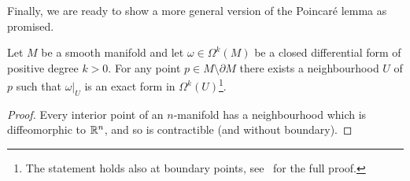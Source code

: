 Finally, we are ready to show a more general version of the Poincar\'e lemma as promised.

\begin{corollary}\label{cor:plemma}
	Let $M$ be a smooth manifold and let $\omega\in\Omega^k(M)$ be a closed differential form of positive degree $k>0$.
	For any point $p\in M\setminus\partial M$ there exists a neighbourhood $U$ of $p$ such that $\omega|_U$ is an exact form in $\Omega^k(U)$\footnote{The statement holds also at boundary points, see~\cite[Corollary 17.15]{book:lee} for the full proof.}.
\end{corollary}
\begin{proof}
	Every interior point of an $n$-manifold has a neighbourhood which is diffeomorphic to $\mathbb{R}^n$, and so is contractible (and without boundary).
\end{proof}
